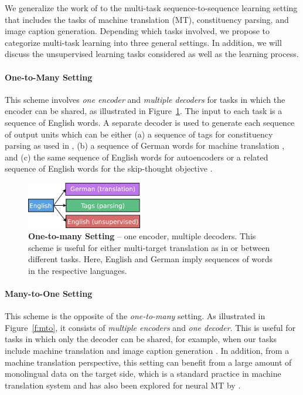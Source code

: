 We generalize the work of \citet{dong15} to the multi-task sequence-to-sequence
learning setting that includes the tasks of machine translation (MT),
constituency parsing, and image caption generation. Depending which tasks 
involved, we propose to categorize multi-task \ssl{} learning into three general
settings.
In addition, we will discuss the unsupervised learning tasks considered as well
as the learning process.

\paragraph{One-to-Many Setting}
This scheme involves {\it one encoder} and {\it multiple decoders} for tasks in
which the encoder can be shared, as illustrated in
Figure~\ref{f:otm}. The input to each task is a sequence of
English words. A separate decoder is used to generate each sequence of
output units which can be either (a) a sequence of tags for
constituency parsing as used in \citep{vinyals15grammar}, (b) a
sequence of German words for machine translation \citep{luong15attn},
and (c) the same sequence of English words for autoencoders or a
related sequence of English words for the skip-thought objective
\citep{kiros15skip}.

\begin{figure}[tbh]
\centering
\includegraphics[width=0.45\textwidth, clip=true, trim= 0 0 0
0]{img/6-1_otm}
\caption[One-to-many Setting]{{\bf One-to-many Setting} -- one encoder, multiple decoders. This scheme
is useful for either multi-target translation as
in \cite{dong15} or between different tasks. Here, English and
German imply sequences of words in the respective languages. 
} 
\label{f:otm}
\end{figure}

\paragraph{Many-to-One Setting}
This scheme is the opposite of the {\it one-to-many}
setting. As illustrated in Figure~\ref{f:mto}, it consists of {\it multiple
encoders} and {\it one decoder}. This is useful for tasks in which only the
decoder can be shared, for example, when our tasks include machine translation
and image caption generation \citep{vinyals15caption}. In addition, from a machine
translation perspective, this setting can benefit from a large
amount of monolingual data on the target side, which is a standard
practice in machine translation system and has also been explored
for neural MT by \cite{gulcehre2015using}.

